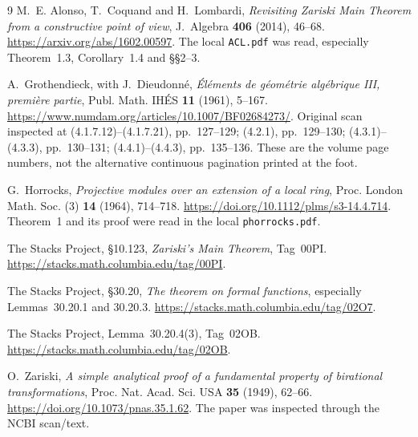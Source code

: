 \documentclass[11pt]{amsart}
\newcommand{\code}[1]{\texttt{#1}}
\begin{document}
\begin{thebibliography}{9}
M.~E. Alonso, T.~Coquand and H.~Lombardi,
\emph{Revisiting Zariski Main Theorem from a constructive point of view},
J.~Algebra \textbf{406} (2014), 46--68.
\url{https://arxiv.org/abs/1602.00597}.
The local \code{ACL.pdf} was read, especially Theorem~1.3,
Corollary~1.4 and \S\S2--3.

A.~Grothendieck, with J.~Dieudonn\'e,
\emph{\'El\'ements de g\'eom\'etrie alg\'ebrique III, premi\`ere partie},
Publ. Math. IH\'ES \textbf{11} (1961), 5--167.
\url{https://www.numdam.org/articles/10.1007/BF02684273/}.
Original scan inspected at (4.1.7.12)--(4.1.7.21), pp.~127--129;
(4.2.1), pp.~129--130; (4.3.1)--(4.3.3), pp.~130--131;
(4.4.1)--(4.4.3), pp.~135--136. These are the volume page numbers,
not the alternative continuous pagination printed at the foot.

G.~Horrocks, \emph{Projective modules over an extension of a local ring},
Proc. London Math. Soc. (3) \textbf{14} (1964), 714--718.
\url{https://doi.org/10.1112/plms/s3-14.4.714}.
Theorem~1 and its proof were read in the local \code{phorrocks.pdf}.

The Stacks Project, \S10.123, \emph{Zariski's Main Theorem}, Tag~00PI.
\url{https://stacks.math.columbia.edu/tag/00PI}.

The Stacks Project, \S30.20, \emph{The theorem on formal functions},
especially Lemmas~30.20.1 and 30.20.3.
\url{https://stacks.math.columbia.edu/tag/02O7}.

The Stacks Project, Lemma~30.20.4(3), Tag~02OB.
\url{https://stacks.math.columbia.edu/tag/02OB}.

O.~Zariski, \emph{A simple analytical proof of a fundamental property
of birational transformations}, Proc. Nat. Acad. Sci. USA
\textbf{35} (1949), 62--66.
\url{https://doi.org/10.1073/pnas.35.1.62}.
The paper was inspected through the NCBI scan/text.
\end{thebibliography}
\end{document}
